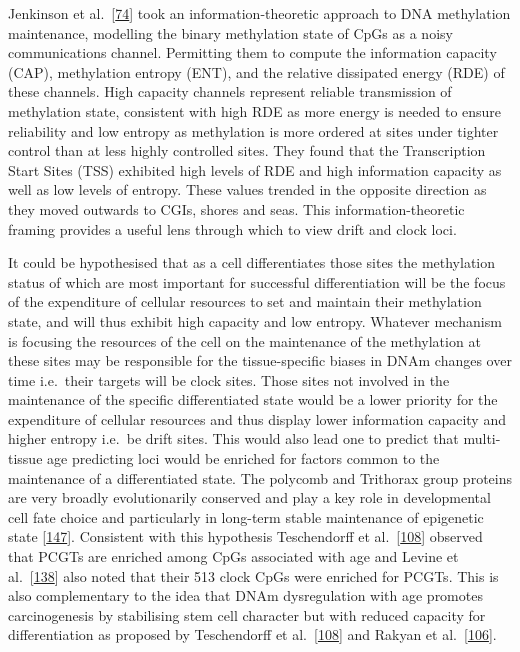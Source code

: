 \documentclass[
]{book}
\begin{document}
Jenkinson et al.~{[}\protect\hyperlink{ref-Jenkinson2017}{74}{]} took an information-theoretic approach to DNA methylation maintenance, modelling the binary methylation state of CpGs as a noisy communications channel.
Permitting them to compute the information capacity (CAP), methylation entropy (ENT), and the relative dissipated energy (RDE) of these channels.
High capacity channels represent reliable transmission of methylation state, consistent with high RDE as more energy is needed to ensure reliability and low entropy as methylation is more ordered at sites under tighter control than at less highly controlled sites.
They found that the Transcription Start Sites (TSS) exhibited high levels of RDE and high information capacity as well as low levels of entropy.
These values trended in the opposite direction as they moved outwards to CGIs, shores and seas.
This information-theoretic framing provides a useful lens through which to view drift and clock loci.

It could be hypothesised that as a cell differentiates those sites the methylation status of which are most important for successful differentiation will be the focus of the expenditure of cellular resources to set and maintain their methylation state, and will thus exhibit high capacity and low entropy.
Whatever mechanism is focusing the resources of the cell on the maintenance of the methylation at these sites may be responsible for the tissue-specific biases in DNAm changes over time i.e.~their targets will be clock sites.
Those sites not involved in the maintenance of the specific differentiated state would be a lower priority for the expenditure of cellular resources and thus display lower information capacity and higher entropy i.e.~be drift sites.
This would also lead one to predict that multi-tissue age predicting loci would be enriched for factors common to the maintenance of a differentiated state.
The polycomb and Trithorax group proteins are very broadly evolutionarily conserved and play a key role in developmental cell fate choice and particularly in long-term stable maintenance of epigenetic state {[}\protect\hyperlink{ref-Schuettengruber2017}{147}{]}.
Consistent with this hypothesis Teschendorff et al.~{[}\protect\hyperlink{ref-Teschendorff2010}{108}{]} observed that PCGTs are enriched among CpGs associated with age and Levine et al.~{[}\protect\hyperlink{ref-Levine2018}{138}{]} also noted that their 513 clock CpGs were enriched for PCGTs.
This is also complementary to the idea that DNAm dysregulation with age promotes carcinogenesis by stabilising stem cell character but with reduced capacity for differentiation as proposed by Teschendorff et al.~{[}\protect\hyperlink{ref-Teschendorff2010}{108}{]} and Rakyan et al.~{[}\protect\hyperlink{ref-Rakyan2010}{106}{]}.
\end{document}
